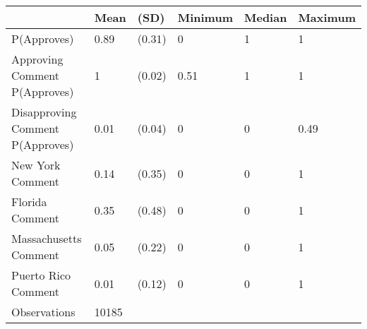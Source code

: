 
\begin{tabular}[t]{llllll}
\toprule
 & Mean & (SD) & Minimum & Median & Maximum\\
\midrule
P(Approves) & 0.89 & (0.31) & 0 & 1 & 1\\
Approving Comment P(Approves) & 1 & (0.02) & 0.51 & 1 & 1\\
Disapproving Comment P(Approves) & 0.01 & (0.04) & 0 & 0 & 0.49\\
New York Comment & 0.14 & (0.35) & 0 & 0 & 1\\
Florida Comment & 0.35 & (0.48) & 0 & 0 & 1\\
\addlinespace
Massachusetts Comment & 0.05 & (0.22) & 0 & 0 & 1\\
Puerto Rico Comment & 0.01 & (0.12) & 0 & 0 & 1\\
\midrule
Observations & 10185 &  &  &  & \\
\bottomrule
\end{tabular}
